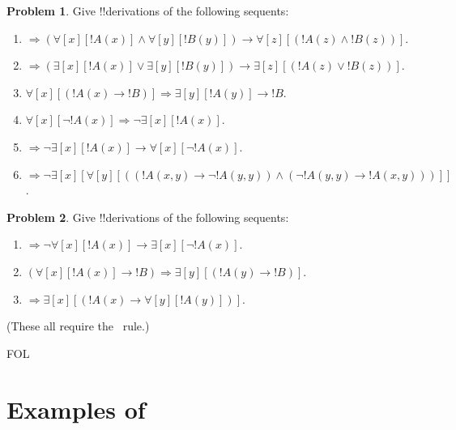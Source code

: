 \documentclass[10pt,a4paper]{article}
\theoremstyle{plain}
\theoremstyle{definition}
\newtheorem{prob}{Problem}[section]
\theoremstyle{remark}
\newcommand*{\olfileid}[3]{}
\newcommand*{\olsection}[1]{\section*{#1}}
\providecommand{\lif}{\mathbin{\rightarrow}}
\providecommand{\lforall}{\mathord{\forall}}
\providecommand{\lexists}{\mathord{\exists}}
\providecommand{\Sequent}{\mathrel{\Rightarrow}}
\providecommand{\iftag}[1]{#1}
\providecommand{\RightR}[1]{}
\providecommand{\RightR}{\mathrm{R}}
\providecommand{\Contraction}{\mathrm{C}}
\providecommand{\Contraction}{\mathrm{C}}
\providecommand{\iftag}{}
\begin{document}
\begin{prob}
Give !!{derivation}s of the following sequents:
\begin{enumerate}
\item $\Sequent (\lforall[x][!A(x)] \land \lforall[y][!B(y)]) \lif
\lforall[z][(!A(z) \land !B(z))]$.
\item $\Sequent (\lexists[x][!A(x)] \lor \lexists[y][!B(y)]) \lif
\lexists[z][(!A(z) \lor !B(z))]$.
\item $\lforall[x][(!A(x) \lif !B)] \Sequent \lexists[y][!A(y)] \lif !B$.
\item $\lforall[x][\lnot !A(x)] \Sequent \lnot\lexists[x][!A(x)]$.
\item $\Sequent \lnot\lexists[x][!A(x)] \lif \lforall[x][\lnot !A(x)]$.
\item $\Sequent \lnot\lexists[x][\lforall[y][((!A(x,y) \lif \lnot
!A(y,y)) \land (\lnot !A(y,y) \lif !A(x,y)))]]$.
\end{enumerate}
\end{prob}

\begin{prob}
Give !!{derivation}s of the following sequents:
\begin{enumerate}
\item $\Sequent \lnot\lforall[x][!A(x)] \lif \lexists[x][\lnot!A(x)]$.
\item $(\lforall[x][!A(x)] \lif !B) \Sequent \lexists[y][(!A(y) \lif !B)]$.
\item $\Sequent \lexists[x][(!A(x) \lif \lforall[y][!A(y)])]$.
\end{enumerate}
(These all require the $\RightR{\Contraction}$~rule.)
\end{prob}





\iftag{FOL}
      {\olfileid{fol}{seq}{pro}}
      {\olfileid{pl}{seq}{pro}}

\olsection{Examples of }
\end{document}

